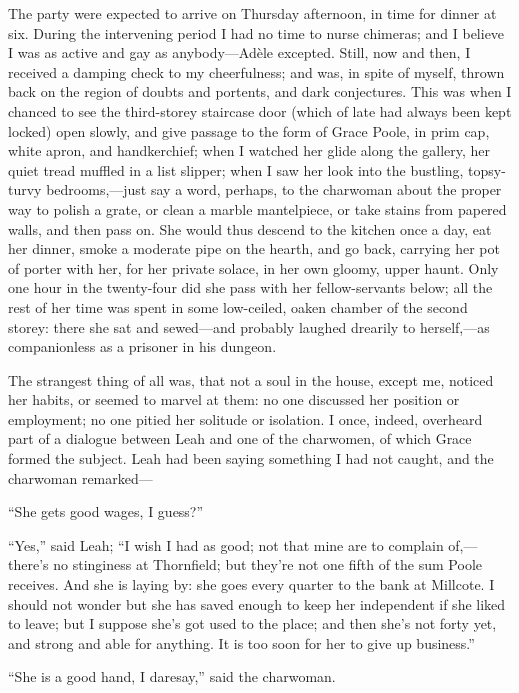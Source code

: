 The party were expected to arrive on Thursday afternoon, in time for
dinner at six. During the intervening period I had no time to nurse
chimeras; and I believe I was as active and gay as anybody---Adèle
excepted. Still, now and then, I received a damping check to my
cheerfulness; and was, in spite of myself, thrown back on the region of
doubts and portents, and dark conjectures. This was when I chanced to
see the third-storey staircase door (which of late had always been kept
locked) open slowly, and give passage to the form of Grace Poole, in
prim cap, white apron, and handkerchief; when I watched her glide along
the gallery, her quiet tread muffled in a list slipper; when I saw her
look into the bustling, topsy-turvy bedrooms,---just say a word,
perhaps, to the charwoman about the proper way to polish a grate, or
clean a marble mantelpiece, or take stains from papered walls, and then
pass on. She would thus descend to the kitchen once a day, eat her
dinner, smoke a moderate pipe on the hearth, and go back, carrying her
pot of porter with her, for her private solace, in her own gloomy, upper
haunt. Only one hour in the twenty-four did she pass with her
fellow-servants below; all the rest of her time was spent in some
low-ceiled, oaken chamber of the second storey: there she sat and
sewed---and probably laughed drearily to herself,---as companionless as
a prisoner in his dungeon.

The strangest thing of all was, that not a soul in the house, except me,
noticed her habits, or seemed to marvel at them: no one discussed her
position or employment; no one pitied her solitude or isolation. I
once, indeed, overheard part of a dialogue between Leah and one of the
charwomen, of which Grace formed the subject. Leah had been saying
something I had not caught, and the charwoman remarked---

\enquote{She gets good wages, I guess?}

\enquote{Yes,} said Leah; \enquote{I wish I had as good; not that mine
	are to complain of,---there's no stinginess at Thornfield; but they're
	not one fifth of the sum \Mrs{} Poole receives. And she is laying by: she
	goes every quarter to the bank at Millcote. I should not wonder but she
	has saved enough to keep her independent if she liked to leave; but I
	suppose she's got used to the place; and then she's not forty yet, and
	strong and able for anything. It is too soon for her to give up
	business.}

\enquote{She is a good hand, I daresay,} said the charwoman.

